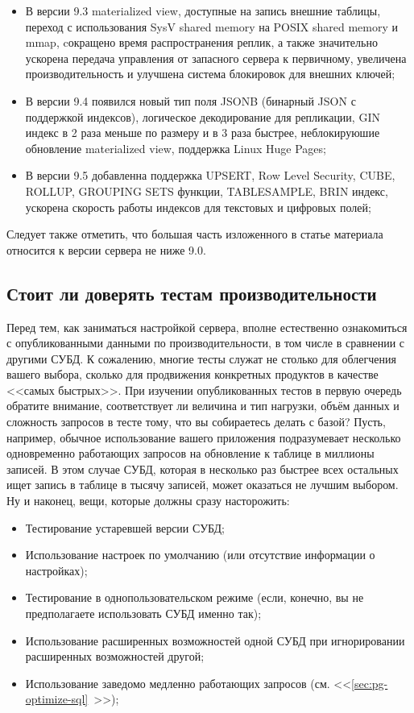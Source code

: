 \begin{itemize}
  \item В версии 9.3 materialized view, доступные на запись внешние таблицы, переход с использования SysV shared memory на POSIX shared memory и mmap, cокращено время распространения реплик, а также значительно ускорена передача управления от запасного сервера к первичному, увеличена производительность и улучшена система блокировок для внешних ключей;
  \item В версии 9.4 появился новый тип поля JSONB (бинарный JSON с поддержкой индексов), логическое декодирование для репликации, GIN индекс в 2 раза меньше по размеру и в 3 раза быстрее, неблокируюшие обновление materialized view, поддержка Linux Huge Pages;
  \item В версии 9.5 добавленна поддержка UPSERT, Row Level Security, CUBE, ROLLUP, GROUPING SETS функции, TABLESAMPLE, BRIN индекс, ускорена скорость работы индексов для текстовых и цифровых полей;
\end{itemize}

Следует также отметить, что большая часть изложенного в статье материала относится к версии сервера не ниже 9.0.


\subsection{Стоит ли доверять тестам производительности}

Перед тем, как заниматься настройкой сервера, вполне естественно ознакомиться с опубликованными данными по производительности, в том числе в сравнении с другими СУБД. К сожалению, многие тесты служат не столько для облегчения вашего выбора, сколько для продвижения конкретных продуктов в качестве <<самых быстрых>>. При изучении опубликованных тестов в первую очередь обратите внимание, соответствует ли величина и тип нагрузки, объём данных и сложность запросов в тесте тому, что вы собираетесь делать с базой? Пусть, например, обычное использование вашего приложения подразумевает несколько одновременно работающих запросов на обновление к таблице в миллионы записей. В этом случае СУБД, которая в несколько раз
быстрее всех остальных ищет запись в таблице в тысячу записей, может оказаться не лучшим выбором. Ну и наконец, вещи, которые должны сразу насторожить:

\begin{itemize}
  \item Тестирование устаревшей версии СУБД;
  \item Использование настроек по умолчанию (или отсутствие информации о настройках);
  \item Тестирование в однопользовательском режиме (если, конечно, вы не предполагаете использовать СУБД именно так);
  \item Использование расширенных возможностей одной СУБД при игнорировании расширенных возможностей другой;
  \item Использование заведомо медленно работающих запросов (см. <<\ref{sec:pg-optimize-sql}~>>);
\end{itemize}


